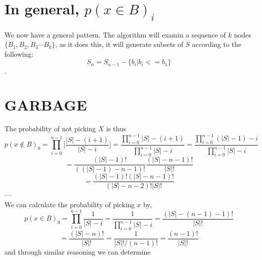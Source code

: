 \documentclass[10pt,a4paper]{article}
\begin{document}
\section*{In general, $p(x \in B)_i$}
We now have a general pattern. The algorithm will examin a sequence of $k$ nodes $\{B_1, B_2, B_3 \cdots B_k\}$, as it does this, it will generate subsets of $S$ according to the following:
$$S_n = S_{n-1} - \{b_i | b_i <= b_1 \}$$.
\section*{GARBAGE}
The probability of not picking $X$ is thus
$$p(x \not \in B)_0 = \prod_{i=0}^{n-1} \bigg[ \frac{|S|-(i + 1)}{|S| - i} \bigg]
= \frac{\prod_{i=0}^{n-1} |S|- (i+1)}{\prod_{i=0}^{n-1} |S| - i}
= \frac{\prod_{i=0}^{n-1} (|S|-1)-i}{\prod_{i=0}^{n-1} |S| - i}$$
$$= \frac{(|S|-1)!}{((|S| - 1) - n - 1)!} \frac{(|S| - n - 1)!}{|S|!}$$
$$= \frac{(|S|-1)!(|S| - n - 1)!}{(|S| - n - 2)!|S|!}$$
---\\
We can calculate the probability of picking $x$ by,
$$p(x \in B)_0
=\prod_{i=0}^{n-1}\frac{1}{ |S| - i}
=\frac{1}{\prod_{i=0}^{n-1} |S| - i}
= \frac{(|S|-(n-1)-1)!}{|S|!}$$
$$ = \frac{(|S|- n)!}{|S|!}
=\frac{1}{|S|!/(n-1)!} = \frac{(n-1)!}{|S|!}$$
and through similar reasoning we can determine
\end{document}
